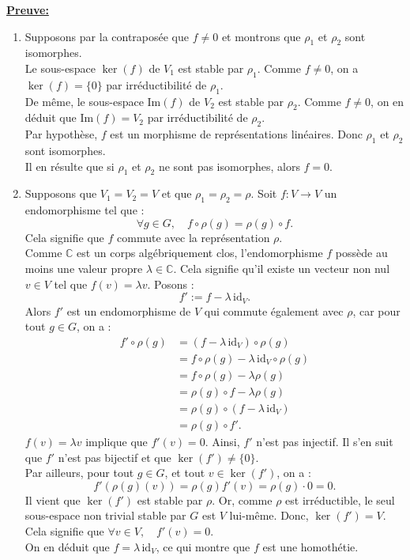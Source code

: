 \documentclass[a4paper, 14pt]{report}
\begin{document}
\begin{onehalfspace}
{			
			\textbf{\underline{Preuve:}}
			\begin{enumerate} [label=\roman*)]
				\item Supposons par la contraposée que \( f \neq 0 \) et montrons que \( \rho_1 \) et \( \rho_2 \) sont isomorphes.\\
				Le sous-espace \( \ker(f) \) de \( V_1 \) est stable par \( \rho_1 \). Comme \( f \neq 0 \), on a \( \ker(f) = \{0\} \) par irréductibilité de \( \rho_1 \).\\
				De même, le sous-espace \( \mathrm{Im}(f) \) de \( V_2 \) est stable par \( \rho_2 \). Comme \( f \neq 0 \), on en déduit que \( \mathrm{Im}(f) = V_2 \) par irréductibilité de \( \rho_2 \).\\
				Par hypothèse, \( f \) est un morphisme de représentations linéaires. Donc \( \rho_1 \) et \( \rho_2 \) sont isomorphes. \\
				Il en résulte que si \( \rho_1 \) et \( \rho_2 \) ne sont pas isomorphes, alors \( f = 0 \).	
				\item Supposons que \( V_1 = V_2 = V \) et que \( \rho_1 = \rho_2 = \rho \). Soit \( f : V \to V \) un endomorphisme tel que :
				\[
				\forall g \in G, \quad f \circ \rho(g) = \rho(g) \circ f.
				\]
				Cela signifie que \( f \) commute avec la représentation \( \rho \).\\
				Comme \( \mathbb{C} \) est un corps algébriquement clos, l'endomorphisme \( f \) possède au moins une valeur propre \( \lambda \in \mathbb{C} \). Cela signifie qu'il existe un vecteur non nul \( v \in V \) tel que \( f(v) = \lambda v \). Posons :
				\[
				f' := f - \lambda \, \mathrm{id}_V.
				\]
				Alors \( f' \) est un endomorphisme de \( V \) qui commute également avec \( \rho \), car pour tout \( g \in G \), on a :
				\begin{align*}
					f' \circ \rho(g) 
					&= (f - \lambda \, \mathrm{id}_V) \circ \rho(g) \\
					&= f \circ \rho(g) - \lambda \, \mathrm{id}_V \circ \rho(g) \\
					&= f \circ \rho(g) - \lambda \rho(g) \\
					&= \rho(g) \circ f - \lambda \rho(g) \\
					&= \rho(g) \circ (f - \lambda \, \mathrm{id}_V) \\
					&= \rho(g) \circ f'.
				\end{align*}
				\( f(v) = \lambda v \) implique que \( f'(v) = 0 \). Ainsi, \( f' \) n’est pas injectif. Il s'en suit que \(f'\) n'est pas bijectif et que \(\ker(f') \neq \{0\}.\)\\
				Par ailleurs, pour tout \( g \in G \), et tout \( v \in \ker(f') \), on a :
				\[
				f'(\rho(g)(v)) = \rho(g)f'(v) = \rho(g) \cdot 0 = 0.
				\]
				Il vient que \( \ker(f') \) est stable par \( \rho \). Or, comme \( \rho \) est irréductible, le seul sous-espace non trivial stable par \( G \) est \( V \) lui-même. Donc, \(\ker(f') = V \). Cela signifie que \(\forall v \in V, \quad f'(v) = 0.\)\\
				On en déduit que \( f = \lambda \, \mathrm{id}_V \), ce qui montre que \( f \) est une homothétie.
				

\end{enumerate}}
\end{onehalfspace}
\end{document}
